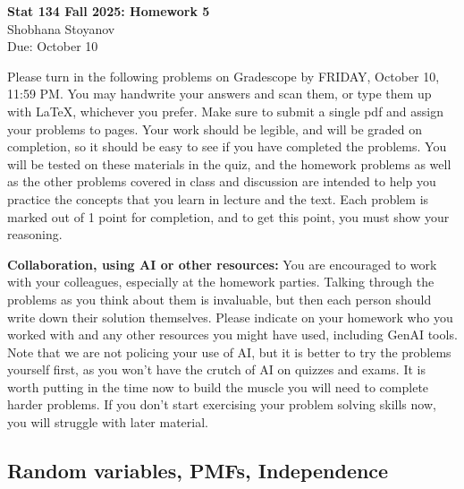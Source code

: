 \documentclass{article}
\begin{document}
\begin{center}
    \textbf{\large Stat 134 Fall 2025: Homework 5} \\[6pt]
    Shobhana Stoyanov \\[6pt]
    \small Due: October 10
\end{center}

\vspace{1em}

\noindent Please turn in the following problems on Gradescope by FRIDAY, October 10, 11:59 PM. You may handwrite your answers and scan them, or type them up with \LaTeX, whichever you prefer. Make sure to submit a single pdf and assign your problems to pages. Your work should be legible, and will be graded on completion, so it should be easy to see if you have completed the problems. You will be tested on these materials in the quiz, and the homework problems as well as the other problems covered in class and discussion are intended to help you practice the concepts that you learn in lecture and the text. Each problem is marked out of 1 point for completion, and to get this point, you must show your reasoning.

\bigskip

\noindent \textbf{Collaboration, using AI or other resources:} You are encouraged to work with your colleagues, especially at the homework parties. Talking through the problems as you think about them is invaluable, but then each person should write down their solution themselves. Please indicate on your homework who you worked with and any other resources you might have used, including GenAI tools. Note that we are not policing your use of AI, but it is better to try the problems yourself first, as you won't have the crutch of AI on quizzes and exams. It is worth putting in the time now to build the muscle you will need to complete harder problems. If you don't start exercising your problem solving skills now, you will struggle with later material.

\bigskip

\subsection*{Random variables, PMFs, Independence}
\end{document}
